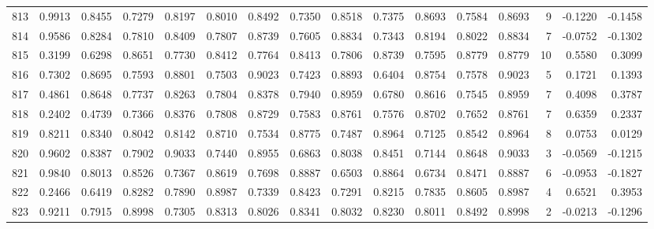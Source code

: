 \begin{tabular}{lrrrrrrrrrrrrrrr}
813 &      0.9913 &  0.8455 &  0.7279 &  0.8197 &  0.8010 &  0.8492 &  0.7350 &  0.8518 &  0.7375 &  0.8693 &   0.7584 &     0.8693 &      9 &                   -0.1220 &                    -0.1458 \\
814 &      0.9586 &  0.8284 &  0.7810 &  0.8409 &  0.7807 &  0.8739 &  0.7605 &  0.8834 &  0.7343 &  0.8194 &   0.8022 &     0.8834 &      7 &                   -0.0752 &                    -0.1302 \\
815 &      0.3199 &  0.6298 &  0.8651 &  0.7730 &  0.8412 &  0.7764 &  0.8413 &  0.7806 &  0.8739 &  0.7595 &   0.8779 &     0.8779 &     10 &                    0.5580 &                     0.3099 \\
816 &      0.7302 &  0.8695 &  0.7593 &  0.8801 &  0.7503 &  0.9023 &  0.7423 &  0.8893 &  0.6404 &  0.8754 &   0.7578 &     0.9023 &      5 &                    0.1721 &                     0.1393 \\
817 &      0.4861 &  0.8648 &  0.7737 &  0.8263 &  0.7804 &  0.8378 &  0.7940 &  0.8959 &  0.6780 &  0.8616 &   0.7545 &     0.8959 &      7 &                    0.4098 &                     0.3787 \\
818 &      0.2402 &  0.4739 &  0.7366 &  0.8376 &  0.7808 &  0.8729 &  0.7583 &  0.8761 &  0.7576 &  0.8702 &   0.7652 &     0.8761 &      7 &                    0.6359 &                     0.2337 \\
819 &      0.8211 &  0.8340 &  0.8042 &  0.8142 &  0.8710 &  0.7534 &  0.8775 &  0.7487 &  0.8964 &  0.7125 &   0.8542 &     0.8964 &      8 &                    0.0753 &                     0.0129 \\
820 &      0.9602 &  0.8387 &  0.7902 &  0.9033 &  0.7440 &  0.8955 &  0.6863 &  0.8038 &  0.8451 &  0.7144 &   0.8648 &     0.9033 &      3 &                   -0.0569 &                    -0.1215 \\
821 &      0.9840 &  0.8013 &  0.8526 &  0.7367 &  0.8619 &  0.7698 &  0.8887 &  0.6503 &  0.8864 &  0.6734 &   0.8471 &     0.8887 &      6 &                   -0.0953 &                    -0.1827 \\
822 &      0.2466 &  0.6419 &  0.8282 &  0.7890 &  0.8987 &  0.7339 &  0.8423 &  0.7291 &  0.8215 &  0.7835 &   0.8605 &     0.8987 &      4 &                    0.6521 &                     0.3953 \\
823 &      0.9211 &  0.7915 &  0.8998 &  0.7305 &  0.8313 &  0.8026 &  0.8341 &  0.8032 &  0.8230 &  0.8011 &   0.8492 &     0.8998 &      2 &                   -0.0213 &                    -0.1296 \\

\end{tabular}
